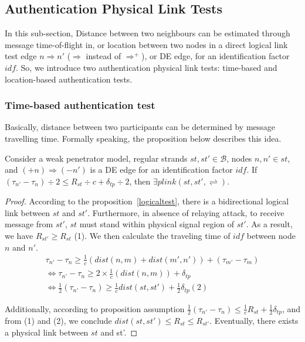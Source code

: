 \subsection{Authentication Physical Link Tests}

In this sub-section, Distance between two neighbours can be estimated through message time-of-flight in, or location between two nodes in a direct logical link test edge $n \Rightarrow n'$ ($\Rightarrow$ instead of $\Rightarrow^+$), or DE edge, for an identification factor $idf$. So, we introduce two authentication physical link tests: time-based and location-based authentication tests. 

\subsubsection*{Time-based authentication test}

Basically, distance between two participants can be determined by message travelling time. Formally speaking, the proposition below describes this idea.

\begin{Proposition}\label{difrange}
Consider a weak penetrator model, regular strands $st, st' \in \mathcal{B}$, nodes $n,n' \in st$, and $(+n) \Rightarrow (-n')$ is a DE edge for an identification factor $idf$. If $(\tau_{n'} - \tau_{n})\div 2 \le R_{st} \div c + \delta_{tp} \div 2$, then $\exists plink(st,st',\rightleftharpoons)$. 
\end{Proposition}

\begin{proof}

According to the proposition~\ref{logicaltest}, there is a bidirectional logical link between $st$ and $st'$. Furthermore, in absence of relaying attack, to receive message from $st'$, $st$ must stand within physical signal region of $st'$. As a result, we have $R_{st'} \ge R_{st}$ (1). We then calculate the traveling time of $idf$ between node $n$ and $n'$. 
\begin{equation*}
\begin{split}
  	 \tau_{n'} - \tau_{n} \ge \frac 1 {c}(dist(n,m) + dist(m', n')) + (\tau_{m'} - \tau_{m}) \\ \Leftrightarrow 
	 \tau_{n'} - \tau_{n} \ge 2 \times \frac 1 {c}(dist(n,m)) + \delta_{tp} \\ \Leftrightarrow 
	 \frac 1 {2} (\tau_{n'} - \tau_{n}) \ge \frac 1 {c} dist(st,st') + \frac 1 {2} \delta_{tp} (2)
\end{split}
\end{equation*}

Additionally, according to proposition assumption $ \frac 1 {2} (\tau_{n'} - \tau_{n}) \le \frac 1 {c} R_{st} + \frac 1 {2} \delta_{tp} $, and from (1) and (2), we conclude $dist(st,st') \le R_{st} \le R_{st'} $. Eventually, there exists a physical link between $st$ and st'.
\end{proof}

